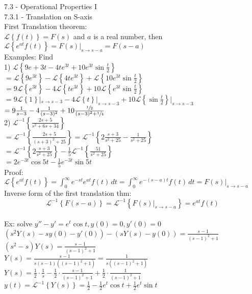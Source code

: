 \documentclass[a4paper, 12pt]{article}
\renewcommand{\L}[1] {\ensuremath{\mathscr{L}\left\{#1\right\}}}
\newcommand{\Li}[1] {\ensuremath{\mathscr{L}^{-1}\left\{#1\right\}}}
\begin{document}
    7.3 - Operational Properties I\\[20px]
    7.3.1 - Translation on S-axis\\[20px]
    First Translation theorem:\\
    $\L{f(t)} = F(s)$ and $a$ is a real number, then $\L{e^{at}f(t)} = F(s)|_{s \to s-a} = F(s-a)$\\[20px]
    
    Examples: Find\\[20px]
    1) $\L{9e+{3t} - 4te^{3t} + 10e^{3t}\sin{\frac{t}{2}}}$\\
    $ = \L{9e^{3t}} - \L{4te^{3t}} + \L{10e^{3t}\sin{\frac{t}{2}}} $\\
    $ = 9\L{e^{3t}} - 4\L{te^{3t}} + 10\L{e^{3t}\sin{\frac{t}{2}}} $\\
    $ = 9\L{1}|_{s \to s-3} - 4\L{t}|_{s \to s-3} + 10\L{\sin{\frac{t}{2}}}|_{s \to s-3} $\\
    $ = 9\frac{1}{s-3} - 4\frac{1}{(s-3)^2} + 10\frac{\sfrac{1}{2}}{(s - 3)^2 + \sfrac{1}{4}} $\\[20px]
    2) $\Li{\frac{2s + 5}{s^2 + 6s + 34}}$\\
    $ = \Li{\frac{2s + 5}{(s+3)^2 + 25}} = \Li{2\frac{s + 3}{s^2 + 25} - \frac{1}{s^2 + 25}} $\\
    $ = \Li{2\frac{s + 3}{s^2 + 25}} - \frac{1}{5}\Li{\frac{51}{s^2 + 25}} $\\
    $ = 2e^{-3t}\cos{5t} -  \frac{1}{5}e^{-3t}\sin{5t} $\\[20px]
    Proof: $ \L{e^{at}f(t)} = \int_0^\infty{e^{-st}e^{at}f(t)\,dt} = \int_0^\infty{e^{-(s-a)t}f(t)\,dt} = F(s)|_{s \to s-a} $\\[20px]
    Inverse form of the first translation thm:\\
    $$ \Li{F(s-a)} = \Li{F(s)|_{s \to s-a}} = e^{at}f(t) $$\\
    Ex: solve $ y'' - y' = e^t\cos{t}, y(0) = 0, y'(0) = 0 $\\[10px]
    $ (s^2Y(s) - sy(0) - y'(0)) - (sY(s) - y(0)) = \frac{s-1}{(s-1)^2 + 1} $\\[10px]
    $ (s^2 - s)Y(s) = \frac{s-1}{(s-1)^2 + 1} $\\[10px]
    $ Y(s) = \frac{s-1}{s(s-1)((s-1)^2 + 1)} = \frac{1}{s((s-1)^2 + 1)} $\\[10px]
    $ Y(s) = \frac{1}{2}\cdot\frac{1}{s} - \frac{1}{2}\cdot\frac{s-1}{(s-1)^2 + 1} + \frac{1}{2}\cdot\frac{1}{(s-1)^2 + 1} $\\[10px]
    $ y(t) = \Li{Y(s)} = \frac{1}{2} - \frac{1}{2}e^t\cos{t} + \frac{1}{2}e^t\sin{t} $\\[20px]
\end{document}
